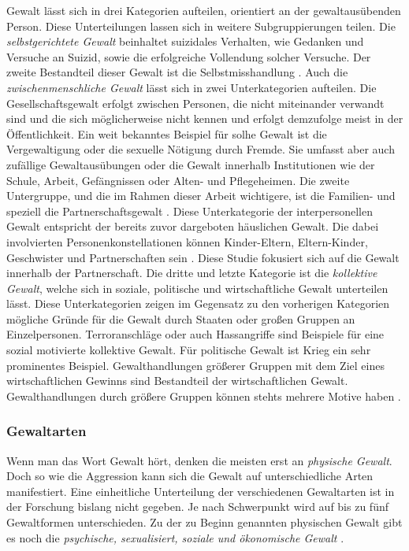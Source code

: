 Gewalt lässt sich in drei Kategorien aufteilen, orientiert an der gewaltausübenden Person. Diese Unterteilungen lassen sich in weitere Subgruppierungen teilen. Die \textit{selbstgerichtete Gewalt} beinhaltet suizidales Verhalten, wie Gedanken und Versuche an Suizid, sowie die erfolgreiche Vollendung solcher Versuche. Der zweite Bestandteil dieser Gewalt ist die Selbstmisshandlung \parencite{Gewaltarten_WHO}. Auch die \textit{zwischenmenschliche Gewalt} lässt sich in zwei Unterkategorien aufteilen. Die Gesellschaftsgewalt erfolgt zwischen Personen, die nicht miteinander verwandt sind und die sich möglicherweise nicht kennen und erfolgt demzufolge meist in der Öffentlichkeit. Ein weit bekanntes Beispiel für solhe Gewalt ist die Vergewaltigung oder die sexuelle Nötigung durch Fremde. Sie umfasst aber auch zufällige Gewaltausübungen oder die Gewalt innerhalb Institutionen wie der Schule, Arbeit, Gefängnissen oder Alten- und Pflegeheimen. Die zweite Untergruppe, und die im Rahmen dieser Arbeit wichtigere, ist die Familien- und speziell die Partnerschaftsgewalt \parencite{Gewaltarten_WHO}. Diese Unterkategorie der interpersonellen Gewalt entspricht der bereits zuvor dargeboten häuslichen Gewalt. Die dabei involvierten Personenkonstellationen können Kinder-Eltern, Eltern-Kinder, Geschwister und Partnerschaften sein \parencite{Def_Form_Folge_Gewalt}. Diese Studie fokusiert sich auf die Gewalt innerhalb der Partnerschaft. Die dritte und letzte Kategorie ist die \textit{kollektive Gewalt}, welche sich in soziale, politische und wirtschaftliche Gewalt unterteilen lässt. Diese Unterkategorien zeigen im Gegensatz zu den vorherigen Kategorien mögliche Gründe für die Gewalt durch Staaten oder großen Gruppen an Einzelpersonen. Terroranschläge oder auch Hassangriffe sind Beispiele für eine sozial motivierte kollektive Gewalt. Für politische Gewalt ist Krieg ein sehr prominentes Beispiel. Gewalthandlungen größerer Gruppen mit dem Ziel eines wirtschaftlichen Gewinns sind Bestandteil der wirtschaftlichen Gewalt. Gewalthandlungen durch größere Gruppen können stehts mehrere Motive haben \parencite{Gewaltarten_WHO}.


\subsubsection{Gewaltarten}     \label{2.1.2.1}
Wenn man das Wort Gewalt hört, denken die meisten erst an \textit{physische Gewalt}. Doch so wie die Aggression kann sich die Gewalt auf unterschiedliche Arten manifestiert. Eine einheitliche Unterteilung der verschiedenen Gewaltarten ist in der Forschung bislang nicht gegeben. Je nach Schwerpunkt wird auf bis zu fünf Gewaltformen unterschieden. Zu der zu Beginn genannten physischen Gewalt gibt es noch die \textit{psychische, sexualisiert, soziale und ökonomische Gewalt} \parencite{Def_Form_Folge_Gewalt}.

